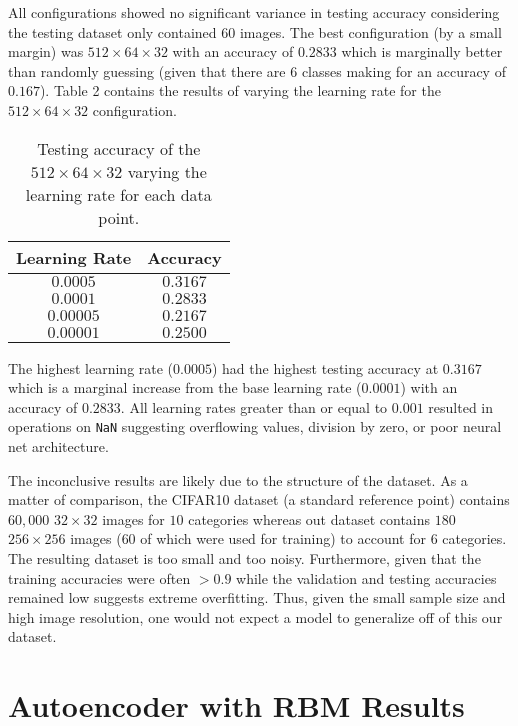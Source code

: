 \documentclass[a4paper]{article}
\begin{document}
All configurations showed no significant variance in testing accuracy
considering the testing dataset only contained $60$ images.
The best configuration (by a small margin) was $512\times64\times32$ with an
accuracy of $0.2833$ which is marginally better than randomly guessing
(given that there are $6$ classes making for an accuracy of $0.167$).
Table 2 contains the results of varying the learning rate for the
$512\times64\times32$ configuration.

\begin{table}[h]
 \caption{Testing accuracy of the $512\times64\times32$
 varying the learning rate for each data point.}
 \label{table}
 \begin{center}
  \begin{tabular}{c|c}
    \hline \hline
    Learning Rate & Accuracy \\
    \hline
    $0.0005$ & $0.3167$ \\
    $0.0001$ & $0.2833$ \\
    $0.00005$ & $0.2167$ \\
    $0.00001$ & $0.2500$
  \end{tabular}
 \end{center}
\end{table}

The highest learning rate ($0.0005$) had the highest testing accuracy at
$0.3167$ which is a marginal increase from the base learning rate ($0.0001$)
with an accuracy of $0.2833$. All learning rates greater than or equal to
$0.001$ resulted in operations on \texttt{NaN} suggesting overflowing values,
division by zero, or poor neural net architecture.

The inconclusive results are likely due to the structure of the dataset.
As a matter of comparison, the CIFAR10 dataset (a standard reference point)
contains $60,000$ $32\times32$ images for $10$ categories whereas out dataset
contains $180$ $256\times256$ images ($60$ of which were used for training)
to account for $6$ categories. The resulting dataset is too small and too
noisy.
Furthermore, given that the training accuracies were often $>0.9$ while the
validation and testing accuracies remained low suggests extreme overfitting.
Thus, given the small sample size and high image
resolution, one would not expect a model to generalize off of this our dataset.


\section{Autoencoder with RBM Results}
\end{document}
